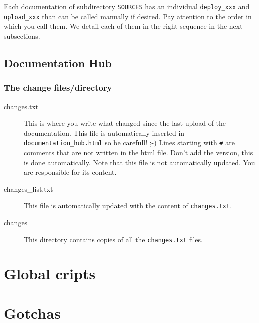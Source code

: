 \documentclass[a4paper,10pt]{article}
\begin{document}
Each documentation of subdirectory \verb+SOURCES+  has an individual \verb+deploy_xxx+ and \verb+upload_xxx+ than can be called manually if desired. Pay attention to the order in which you call them.
 We detail each of them in the right sequence in the next subsections.
\subsection{Documentation Hub}

\subsubsection{The change files/directory}

\begin{description}
 \item[changes.txt] This is where you write what changed since the last upload of the documentation. This file is automatically inserted in \verb+documentation_hub.html+ so be carefull! ;-) Lines starting with \verb+#+ are comments that are not written in the html file. Don't add the version, this is done automatically. Note that this file is not automatically updated. You are responsible for its content.
 \item[changes\_list.txt] This file is automatically updated with the content of \verb+changes.txt+.
 \item[changes] This directory contains copies of all the \verb+changes.txt+ files.
 \end{description}

\section{Global cripts}
\label{global_scripts}


\section{Gotchas}
\end{document}
